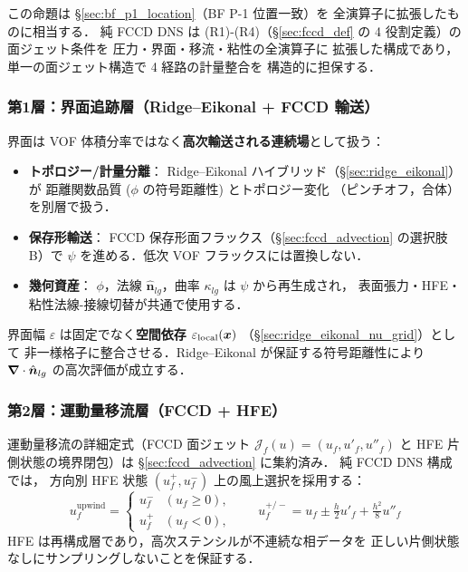 この命題は §\ref{sec:bf_p1_location}（BF P-1 位置一致）を
全演算子に拡張したものに相当する．
純 FCCD DNS は (R1)-(R4)（§\ref{sec:fccd_def} の 4 役割定義）の面ジェット条件を
圧力・界面・移流・粘性の全演算子に
拡張した構成であり，単一の面ジェット構造で 4 経路の計量整合を
構造的に担保する．

\subsubsection{第1層：界面追跡層（Ridge--Eikonal + FCCD 輸送）}
\label{sec:pure_fccd_phase1}

界面は VOF 体積分率ではなく\textbf{高次輸送される連続場}として扱う：
\begin{itemize}[noitemsep]
  \item \textbf{トポロジー/計量分離}：
        Ridge--Eikonal ハイブリッド（§\ref{sec:ridge_eikonal}）が
        距離関数品質 ($\phi$ の符号距離性) とトポロジー変化
        （ピンチオフ，合体）を別層で扱う．
  \item \textbf{保存形輸送}：
        FCCD 保存形面フラックス（§\ref{sec:fccd_advection} の選択肢 B）で
        $\psi$ を進める．低次 VOF フラックスには置換しない．
  \item \textbf{幾何資産}：
        $\phi$，法線 $\hat{\bm n}_{lg}$，曲率 $\kappa_{lg}$ は
        $\psi$ から再生成され，
        表面張力・HFE・粘性法線-接線切替が共通で使用する．
\end{itemize}

界面幅 $\varepsilon$ は固定でなく\textbf{空間依存} $\varepsilon_\text{local}(\bm{x})$
（§\ref{sec:ridge_eikonal_nu_grid}）として
非一様格子に整合させる．Ridge--Eikonal が保証する符号距離性により
$\bm{\nabla}\cdot\hat{\bm n}_{lg}$ の高次評価が成立する．

\subsubsection{第2層：運動量移流層（FCCD + HFE）}
\label{sec:pure_fccd_phase2}

運動量移流の詳細定式（FCCD 面ジェット $\mathcal{J}_f(u)=(u_f,u'_f,u''_f)$ と
HFE 片側状態の境界閉包）は §\ref{sec:fccd_advection} に集約済み．
純 FCCD DNS 構成では，
方向別 HFE 状態 $(u_f^+, u_f^-)$ 上の風上選択を採用する：
\begin{equation}
  u_f^\text{upwind}
    = \begin{cases}
        u_f^- & (u_f \ge 0),\\
        u_f^+ & (u_f < 0),
      \end{cases}
  \qquad
  u_f^{+/-} = u_f \pm \tfrac{h}{2}u'_f + \tfrac{h^2}{8}u''_f
  \label{eq:pure_fccd_hfe_upwind}
\end{equation}
HFE は再構成層であり，高次ステンシルが不連続な相データを
正しい片側状態なしにサンプリングしないことを保証する．

